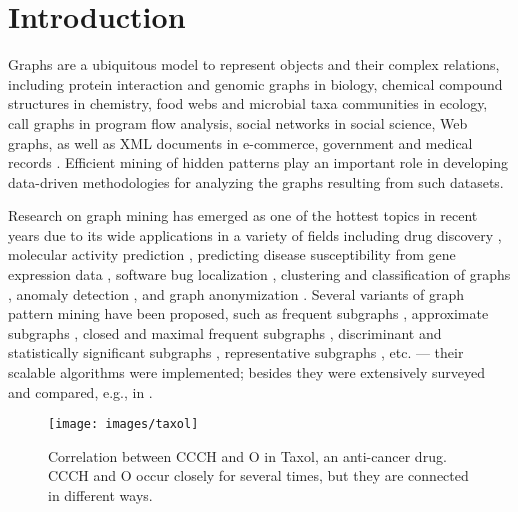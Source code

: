 \chapter{Introduction}
\label{sec:intro}

Graphs are a ubiquitous model to represent objects and their complex relations, including protein interaction and genomic graphs in biology,
chemical compound structures in chemistry, food webs and microbial taxa communities in ecology, call graphs in program flow analysis,
social networks in social science, Web graphs, as well as XML documents in e-commerce, government and medical records \cite{SH12}.
Efficient mining of hidden patterns play an important role in developing data-driven methodologies for analyzing the graphs
resulting from such datasets.

Research on graph mining has emerged as one of the hottest topics in recent years due to its wide applications in a variety of fields including
drug discovery \cite{KK01,NK05,YH02}, molecular activity prediction \cite{JYW10,TCG09},
predicting disease susceptibility from gene expression data \cite{RHS13,DI11}, software bug localization \cite{CLZWY09},
clustering and classification of graphs \cite{DKWK05,YCHY08}, anomaly detection \cite{ATK15}, and graph anonymization \cite{LAW11}.
Several variants of graph pattern mining have been proposed,
such as frequent subgraphs \cite{YH02,EASK14}, approximate subgraphs \cite{KYW10}, closed and maximal frequent subgraphs \cite{HWPY04,YH03},
discriminant and statistically significant subgraphs \cite{TCG09,RS09,YCHY08}, representative subgraphs \cite{CHSBZ08,ZYL09}, etc. --- their scalable algorithms
were implemented; besides they were extensively surveyed and compared, e.g., in \cite{HCXY07,WMFP05,AW10,KR17}.
%
\begin{figure}[t!]
\centering
\texttt{[image: images/taxol]}
\vspace{-2mm}
\caption{\scriptsize Correlation between {\sf CCCH} and {\sf O} in {\sf Taxol}, an anti-cancer drug. {\sf CCCH} and {\sf O}
occur closely for several times, but they are connected in different ways.}
\label{fig:taxol}
\vspace{-6mm}
\end{figure}
%



